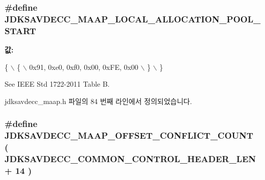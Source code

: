 \subsubsection[{\texorpdfstring{J\+D\+K\+S\+A\+V\+D\+E\+C\+C\+\_\+\+M\+A\+A\+P\+\_\+\+L\+O\+C\+A\+L\+\_\+\+A\+L\+L\+O\+C\+A\+T\+I\+O\+N\+\_\+\+P\+O\+O\+L\+\_\+\+S\+T\+A\+RT}{JDKSAVDECC_MAAP_LOCAL_ALLOCATION_POOL_START}}]{\setlength{\rightskip}{0pt plus 5cm}\#define J\+D\+K\+S\+A\+V\+D\+E\+C\+C\+\_\+\+M\+A\+A\+P\+\_\+\+L\+O\+C\+A\+L\+\_\+\+A\+L\+L\+O\+C\+A\+T\+I\+O\+N\+\_\+\+P\+O\+O\+L\+\_\+\+S\+T\+A\+RT}\hypertarget{group__maap_ga36960965a02d8ab57b5339528373a5f8}{}\label{group__maap_ga36960965a02d8ab57b5339528373a5f8}
{\bfseries 값\+:}
\begin{DoxyCode}
\{                                                                                                          
                      \(\backslash\)
        \{                                                                                                  
                          \(\backslash\)
            0x91, 0xe0, 0xf0, 0x00, 0xFE, 0x00                                                             
                          \(\backslash\)
        \}                                                                                                  
                          \(\backslash\)
    \}
\end{DoxyCode}
See I\+E\+EE Std 1722-\/2011 Table B. 

jdksavdecc\+\_\+maap.\+h 파일의 84 번째 라인에서 정의되었습니다.

\subsubsection[{\texorpdfstring{J\+D\+K\+S\+A\+V\+D\+E\+C\+C\+\_\+\+M\+A\+A\+P\+\_\+\+O\+F\+F\+S\+E\+T\+\_\+\+C\+O\+N\+F\+L\+I\+C\+T\+\_\+\+C\+O\+U\+NT}{JDKSAVDECC_MAAP_OFFSET_CONFLICT_COUNT}}]{\setlength{\rightskip}{0pt plus 5cm}\#define J\+D\+K\+S\+A\+V\+D\+E\+C\+C\+\_\+\+M\+A\+A\+P\+\_\+\+O\+F\+F\+S\+E\+T\+\_\+\+C\+O\+N\+F\+L\+I\+C\+T\+\_\+\+C\+O\+U\+NT~( {\bf J\+D\+K\+S\+A\+V\+D\+E\+C\+C\+\_\+\+C\+O\+M\+M\+O\+N\+\_\+\+C\+O\+N\+T\+R\+O\+L\+\_\+\+H\+E\+A\+D\+E\+R\+\_\+\+L\+EN} + 14 )}\hypertarget{group__maap_gaccacf622b27f9b634ddcf04f09ee2e91}{}\label{group__maap_gaccacf622b27f9b634ddcf04f09ee2e91}


